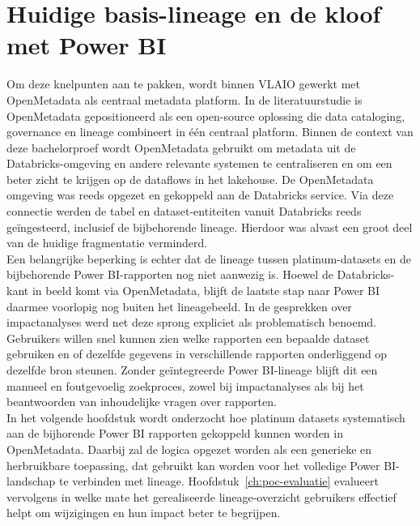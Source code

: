 \section{Huidige basis-lineage en de kloof met Power BI}

Om deze knelpunten aan te pakken, wordt binnen VLAIO gewerkt met OpenMetadata als centraal metadata platform. In de literatuurstudie is OpenMetadata gepositioneerd als een open-source oplossing die data cataloging, governance en lineage combineert in één centraal platform. Binnen de context van deze bachelorproef wordt OpenMetadata gebruikt om metadata uit de Databricks-omgeving en andere relevante systemen te centraliseren en om een beter zicht te krijgen op de dataflows in het lakehouse. De OpenMetadata omgeving was reeds opgezet en gekoppeld aan de Databricks service. Via deze connectie werden de tabel en dataset-entiteiten vanuit Databricks reeds geïngesteerd, inclusief de bijbehorende lineage. Hierdoor was alvast een groot deel van de huidige fragmentatie verminderd.\\

Een belangrijke beperking is echter dat de lineage tussen platinum-datasets en de bijbehorende Power BI-rapporten nog niet aanwezig is. Hoewel de Databricks-kant in beeld komt via OpenMetadata, blijft de laatste stap naar Power BI daarmee voorlopig nog buiten het lineagebeeld. In de gesprekken over impactanalyses werd net deze sprong expliciet als problematisch benoemd. Gebruikers willen snel kunnen zien welke rapporten een bepaalde dataset gebruiken en of dezelfde gegevens in verschillende rapporten onderliggend op dezelfde bron steunen. Zonder geïntegreerde Power BI-lineage blijft dit een manueel en foutgevoelig zoekproces, zowel bij impactanalyses als bij het beantwoorden van inhoudelijke vragen over rapporten.\\

In het volgende hoofdstuk wordt onderzocht hoe platinum datasets systematisch aan de bijhorende Power BI rapporten gekoppeld kunnen worden in OpenMetadata. Daarbij zal de logica opgezet worden als een generieke en herbruikbare toepassing, dat gebruikt kan worden voor het volledige Power BI-landschap te verbinden met lineage. Hoofdstuk~\ref{ch:poc-evaluatie} evalueert vervolgens in welke mate het gerealiseerde lineage-overzicht gebruikers effectief helpt om wijzigingen en hun impact beter te begrijpen.